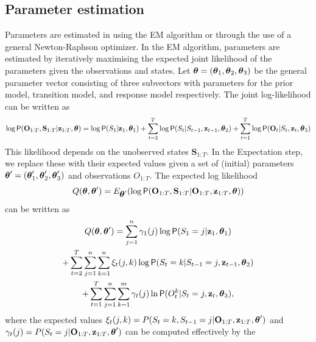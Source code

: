 \documentclass[article]{jss}
\newcommand{\vc}{\mathbf}
\newcommand{\greekv}[1]{\mbox{\boldmath$\mathrm{#1}$}}
\begin{document}
\subsection{Parameter estimation}

Parameters are estimated in  using the EM algorithm or
through the use of a general Newton-Raphson optimizer.  In the EM algorithm, 
parameters are estimated by iteratively maximising the 
expected joint likelihood of the parameters given the observations and states. 
Let $\greekv{\theta} = (\greekv{\theta}_1, \greekv{\theta}_2,\greekv{\theta}_3)$
be the general parameter vector consisting of three subvectors with parameters 
for the prior model, transition model, and response model respectively. The 
joint log-likelihood can be written as
\begin{equation}
\log \Prob(\vc{O}_{1:T}, \vc{S}_{1:T}|\vc{z}_{1:T},\greekv{\theta}) = \log 
\Prob(S_1|\vc{z}_{1},\greekv{\theta}_1) 
+ \sum_{t=2}^{T} \log \Prob(S_t|S_{t-1},\vc{z}_{t-1},\greekv{\theta}_2) 
+ \sum_{t=1}^{T} \log \Prob(\vc{O}_t|S_t,\vc{z}_t,\greekv{\theta}_3)
\end{equation}
This likelihood depends on the unobserved states $\vc{S}_{1:T}$. In the 
Expectation step, we replace these with their expected values given a set of 
(initial) parameters $\greekv{\theta}' = (\greekv{\theta}'_1, 
\greekv{\theta}'_2,\greekv{\theta}'_3)$ and observations $O_{1:T}$. The expected 
log likelihood 
\begin{equation}
Q(\greekv{\theta},\greekv{\theta}') = E_{\greekv{\theta}'} 
(\log \Prob(\vc{O}_{1:T},\vc{S}_{1:T}|\vc{O}_{1:T},\vc{z}_{1:T},\greekv{\theta}))
\end{equation}
can be written as
\begin{multline}
\label{eq:Q}
Q(\greekv{\theta},\greekv{\theta}') = 
\sum_{j=1}^n \gamma_1(j) \log \Prob(S_1=j|\vc{z}_1,\greekv{\theta}_1) \\ 
+ \sum_{t=2}^T \sum_{j=1}^n \sum_{k=1}^n \xi_t(j,k) \log \Prob(S_t = k|S_{t-1} 
= j,\vc{z}_{t-1},\greekv{\theta}_2)  \\
 + \sum_{t=1}^T \sum_{j=1}^n \sum_{k=1}^m \gamma_t(j) 
\ln \Prob(O^k_t|S_t=j,\vc{z}_t,\greekv{\theta}_3),
\end{multline}
where the expected values $\xi_t(j,k) =  P(S_t = k, S_{t-1} = j|\vc{O}_{1:T},
\vc{z}_{1:T},\greekv{\theta}')$ and $\gamma_t(j) = P(S_t = j|\vc{O}_{1:T},
\vc{z}_{1:T},\greekv{\theta}')$ can be computed effectively by the 
\end{document}
